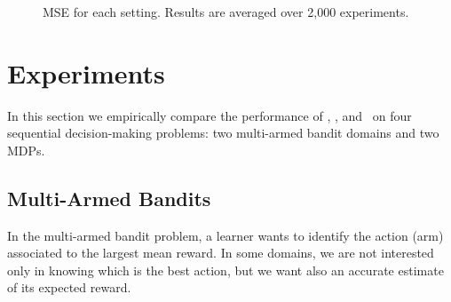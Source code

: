 \begin{figure*}[t]
    \begin{minipage}{\textwidth}
    \centering 
    \setlength\figureheight{4cm}
    \setlength\figurewidth{4.9cm}
    \caption{MSE for each setting. Results are averaged over 2,000 experiments.}\label{F:iAds}
    \end{minipage}
\end{figure*}

\section{Experiments}\label{S:Experiments}
In this section we empirically compare the performance of \WE, \ME, and \CV~on four sequential decision-making problems: two multi-armed bandit domains and two MDPs.

\subsection{Multi-Armed Bandits}
In the multi-armed bandit problem, a learner wants to identify the action (arm) associated to the largest mean reward.
In some domains, we are not interested only in knowing which is the best action, but we want also an accurate estimate of its expected reward.

